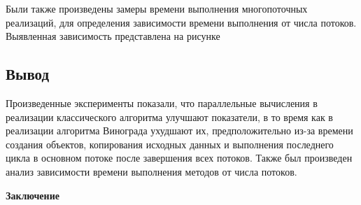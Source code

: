 \documentclass[12pt,a4paper]{scrartcl}
\begin{document}
\begin{center}
	\centering
	\label{fig:two}
\end{center}


\begin{center}
	\centering
	\label{fig:four}
\end{center}

\begin{center}
	\centering
	\label{fig:eight}
\end{center}

\begin{center}
	\centering
	\label{fig:sixteen}
\end{center}

Были также произведены замеры времени выполнения многопоточных реализаций, для определения зависимости времени выполнения от числа потоков. 
Выявленная зависимость представлена на рисунке %

\begin{center}
	\centering
	\label{fig:threads}
\end{center}


\subsection{Вывод}
\label{sec:exp:conclusion}

Произведенные эксперименты показали, что параллельные вычисления в реализации классического алгоритма улучшают показатели, в то время как в реализации алгоритма Винограда ухудшают их, предположительно из-за времени создания объектов, копирования исходных данных и выполнения последнего цикла в основном потоке после завершения всех потоков.
Также был произведен анализ зависимости времени выполнения методов от числа потоков.

\newpage
\begin{center}
	\textbf{Заключение}
	\label{sec:outro}
\end{center}
\end{document}
